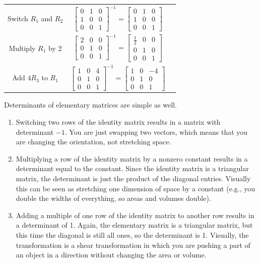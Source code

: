 \begin{center}
\begin{tabular}{ccc}
Switch $R_1$ and $R_2$
&
$\begin{bmatrix}
0&1&0\\
1&0&0\\
0&0&1
\end{bmatrix}^{-1} = 
\begin{bmatrix}
0&1&0\\
1&0&0\\
0&0&1
\end{bmatrix}$
\\
Multiply $R_1$ by 2
&
$\begin{bmatrix}
2&0&0\\
0&1&0\\
0&0&1
\end{bmatrix}^{-1}=
\begin{bmatrix}
\frac{1}{2}&0&0\\
0&1&0\\
0&0&1
\end{bmatrix}
$
\\
Add $4R_3$ to $R_1$
&
$\begin{bmatrix}
1&0&4\\
0&1&0\\
0&0&1
\end{bmatrix}^{-1}=
\begin{bmatrix}
1&0&-4\\
0&1&0\\
0&0&1
\end{bmatrix}
$
\end{tabular}
\end{center}
Determinants of elementary matrices are simple as well. 
\begin{enumerate}
	\item Switching two rows of the identity matrix results in a matrix with determinant $-1$. You are just swapping two vectors, which means that you are changing the orientation, not stretching space. 
	\item Multiplying a row of the identity matrix by a nonzero constant results in a determinant equal to the constant. Since the identity matrix is a triangular matrix, the determinant is just the product of the diagonal entries. Visually this can be seen as stretching one dimension of space by a constant (e.g., you double the widths of everything, so areas and volumes double). 
	\item Adding a multiple of one row of the identity matrix to another row results in a determinant of 1. Again, the elementary matrix is a triangular matrix, but this time the diagonal is still all ones, so the determinant is 1. Visually, the transformation is a shear transformation in which you are pushing a part of an object in a direction without changing the area or volume. 
\end{enumerate}

